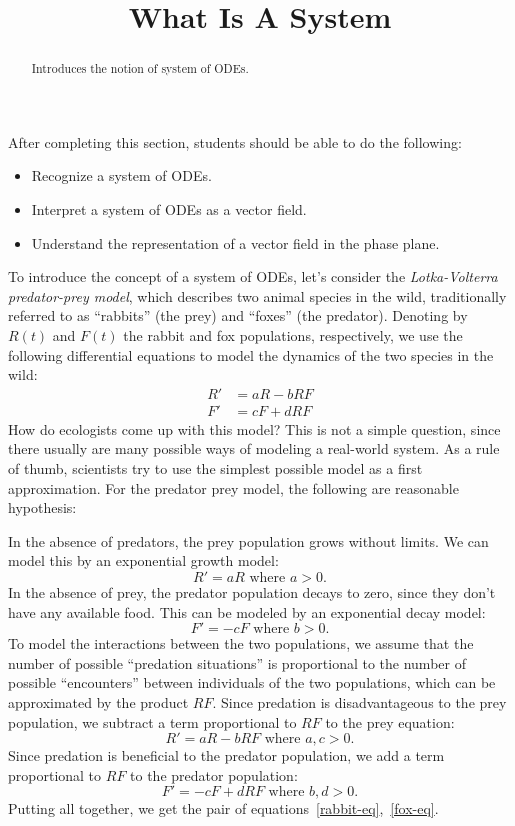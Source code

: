 \documentclass{ximera}
\title{What Is A System}
\begin{document}
\begin{abstract}
Introduces the notion of system of ODEs.
\end{abstract}

\begin{sectionOutcomes}
After completing this section, students should be able to do the following:

\begin{itemize}
\item Recognize a system of ODEs.
\item Interpret a system of ODEs as a vector field.
\item Understand the representation of a vector field in the phase plane.
\end{itemize}

\end{sectionOutcomes}


\maketitle

To introduce the concept of a system of ODEs, let's consider the \emph{Lotka-Volterra predator-prey model}, which describes two animal species in the wild, traditionally referred to as ``rabbits'' (the prey) and ``foxes'' (the predator). Denoting by $R(t)$ and $F(t)$ the rabbit and fox populations, respectively, we use the following differential equations to model the dynamics of the two species in the wild:
\begin{align}
\label{rabbit-eq}R'&=aR-bRF\\
\label{fox-eq}F'&=cF+dRF
\end{align}
How do ecologists come up with this model? This is not a simple question, since there usually are many possible ways of modeling a real-world system. As a rule of thumb, scientists try to use the simplest possible model as a first approximation. For the predator prey model, the following are reasonable hypothesis:

In the absence of predators, the prey population grows without limits. We can model this by an exponential growth model:
\[
R'=aR\text{ where $a>0$}.
\]
In the absence of prey, the predator population decays to zero, since they don't have any available food. This can be modeled by an exponential decay model:
\[
F'=-cF\text{ where $b>0$.}
\]
To model the interactions between the two populations, we assume that the number of possible ``predation situations'' is proportional to the number of possible ``encounters'' between individuals of the two populations, which can be approximated by the product $RF$.
Since predation is disadvantageous to the prey population, we subtract a term proportional to $RF$ to the prey equation:
\[
R'=aR-bRF\text{ where $a,c>0$}.
\]
Since predation is beneficial to the predator population, we add a term proportional to $RF$ to the predator population:
\[
F'=-cF+dRF\text{ where $b,d>0$.}
\]
Putting all together, we get the pair of equations~\ref{rabbit-eq},~\ref{fox-eq}.
\end{document}
